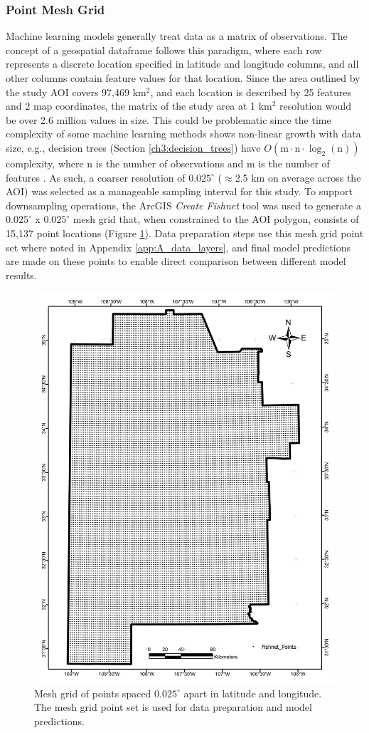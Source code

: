 \subsubsection{Point Mesh Grid}
\label{ch3:meshgrid}
Machine learning models generally treat data as a matrix of observations. The concept of a geospatial dataframe follows this paradigm, where each row represents a discrete location specified in latitude and longitude columns, and all other columns contain feature values for that location. Since the area outlined by the study AOI covers 97,469 km$^2$, and each location is described by 25 features and 2 map coordinates, the matrix of the study area at 1 km$^2$ resolution would be over 2.6 million values in size. This could be problematic since the time complexity of some machine learning methods shows non-linear growth with data size, e.g., decision trees (Section \ref{ch3:decision_trees}) have $O(\text{m} \cdot \text{n} \cdot \log_2(\text{n}))$ complexity, where n is the number of observations and m is the number of features \citep{sani_computational_2018}. As such, a coarser resolution of $0.025^\circ$ ($\approx$2.5 km on average across the AOI) was selected as a manageable sampling interval for this study. To support downsampling operations, the ArcGIS \textit{Create Fishnet} tool was used to generate a $0.025^\circ$ x $0.025^\circ$ mesh grid that, when constrained to the AOI polygon, consists of 15,137 point locations (Figure \ref{fig:meshgrid}). Data preparation steps use this mesh grid point set where noted in Appendix \ref{app:A_data_layers}, and final model predictions are made on these points to enable direct comparison between different model results. 

\begin{figure}
\centering
\includegraphics[width=0.75\linewidth]{templates/images/Figure-Fishnet.pdf}
\caption[Mesh grid point set]{Mesh grid of points spaced $0.025^\circ$ apart in latitude and longitude. The mesh grid point set is used for data preparation and model predictions.} 
\label{fig:meshgrid}
\end{figure}

